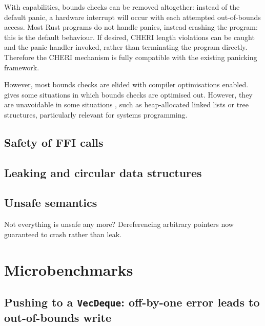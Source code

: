 \documentclass[dissertation.tex]{subfiles}
\begin{document}
With capabilities, bounds checks can be removed altogether: instead of
the default panic, a hardware interrupt will occur with each attempted
out-of-bounds access.
Most Rust programs do not handle panics, instead crashing the program:
this is the default behaviour.
If desired, CHERI length violations can be caught and the panic handler
invoked, rather than terminating the program directly.
Therefore the CHERI mechanism is fully compatible with the existing
panicking framework.

However, most bounds checks are elided with compiler optimisations
enabled.
 gives some situations in which bounds checks are
optimised out.
However, they are unavoidable in some situations , such as
heap-allocated linked lists or tree structures, particularly relevant
for systems programming.



\subsection{Safety of FFI calls}
\label{sec:eval-rust-xprocess}



\subsection{Leaking and circular data structures}


\subsection{Unsafe semantics}
Not everything is unsafe any more? Dereferencing arbitrary pointers now
guaranteed to crash rather than leak.


\section{Microbenchmarks}
\label{sec:eval-micro}




\subsection{Pushing to a \texttt{VecDeque}: off-by-one error leads to out-of-bounds write}
\label{sec:eval-micro-push}
\end{document}
